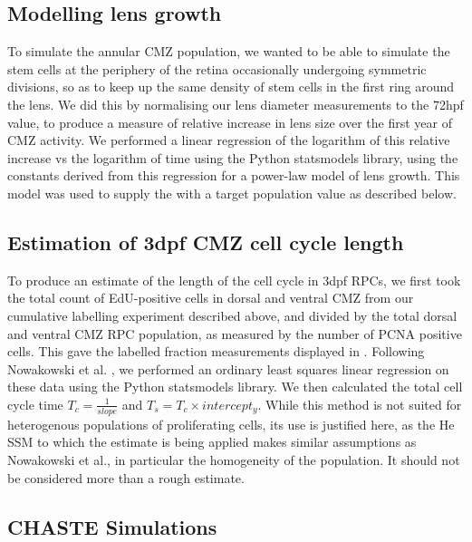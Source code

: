 \documentclass{ut-thesis}
\begin{document}
\begin{NoHyper}
\subsection{Modelling lens growth}
To simulate the annular CMZ population, we wanted to be able to simulate the stem cells at the periphery of the retina occasionally undergoing symmetric divisions, so as to keep up the same density of stem cells in the first ring around the lens. We did this by normalising our lens diameter measurements to the 72hpf value, to produce a measure of relative increase in lens size over the first year of CMZ activity. We performed a linear regression of the logarithm of this relative increase vs the logarithm of time using the Python statsmodels library, using the constants derived from this regression for a power-law model of lens growth. This model was used to supply the  with a target population value as described below.

\subsection{Estimation of 3dpf CMZ cell cycle length}
To produce an estimate of the length of the cell cycle in 3dpf RPCs, we first took the total count of EdU-positive cells in dorsal and ventral CMZ from our cumulative labelling experiment described above, and divided by the total dorsal and ventral CMZ RPC population, as measured by the number of PCNA positive cells. This gave the labelled fraction measurements displayed in . Following Nowakowski et al. \cite{Nowakowski1989}, we performed an ordinary least squares linear regression on these data using the Python statsmodels library. We then calculated the total cell cycle time $T_c = \frac{1}{slope}$ and $T_s = T_c \times intercept_y$. While this method is not suited for heterogenous populations of proliferating cells, its use is justified here, as the He SSM to which the estimate is being applied makes similar assumptions as Nowakowski et al., in particular the homogeneity of the population. It should not be considered more than a rough estimate.

\subsection{CHASTE Simulations}
\label{ssec:CHASTEsims}

\end{NoHyper}
\end{document}
